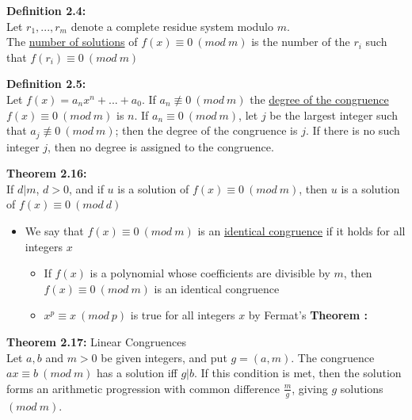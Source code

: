 \documentclass[a4paper]{article}
\begin{document}
\textbf{Definition 2.4:}\\
Let $r_1,...,r_m$ denote a complete residue system modulo $m$.\\
The \underline{number of solutions} of $f(x)\equiv0\ (mod\ m)$ is the number of the $r_i$ such that $f(r_i)\equiv0\ (mod\ m)$


\textbf{Definition 2.5:}\\
Let $f(x)=a_nx^n+...+a_0$. If $a_n\not\equiv0\ (mod\ m)$ the \underline{degree of the congruence} $f(x)\equiv0\ (mod\ m)$ is $n$. If $a_n\equiv0\ (mod\ m)$, let $j$ be the largest integer such that $a_j\not\equiv0\ (mod\ m)$; then the degree of the congruence is $j$. If there is no such integer $j$, then no degree is assigned to the congruence.

\textbf{Theorem 2.16:}\\
If $d|m$, $d>0$, and if $u$ is a solution of $f(x)\equiv0\ (mod\ m)$, then $u$ is a solution of $f(x)\equiv0\ (mod\ d)$
\begin{itemize}
    \item We say that $f(x)\equiv0\ (mod\ m)$ is an \underline{identical congruence} if it holds for all integers $x$
    \begin{itemize}
        \item If $f(x)$ is a polynomial whose coefficients are divisible by $m$, then $f(x)\equiv0\ (mod\ m)$ is an identical congruence
        \item $x^p\equiv x\ (mod\ p)$ is true for all integers $x$ by Fermat's \textbf{Theorem :}\\

    \end{itemize}
\end{itemize}

\textbf{Theorem 2.17:} Linear Congruences\\
Let $a,b$ and $m>0$ be given integers, and put $g=(a,m)$. The congruence $ax\equiv b\ (mod\ m)$ has a solution iff $g|b$. If this condition is met, then the solution forms an arithmetic progression with common difference $\frac{m}{g}$, giving $g$ solutions $(mod\ m)$.
\end{document}
